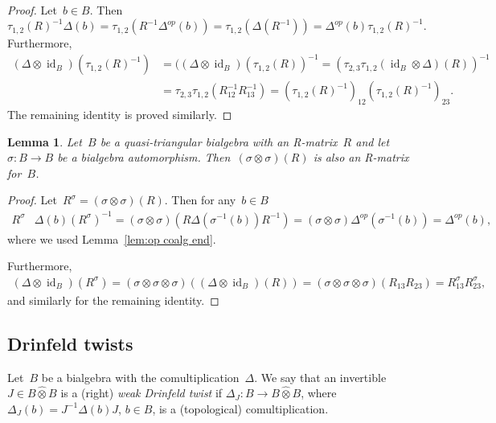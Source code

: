 \documentclass[12pt, reqno]{amsart}
\newcommand{\wh}[1]{\widehat{#1}}
\newtheorem{lemma}[theorem]{Lemma}
\theoremstyle{definition}
\numberwithin{equation}{section}
\newcommand{\tensor}{\otimes}
\DeclareMathOperator{\id}{id}
\begin{document}
\begin{proof}
Let~$b\in B$. Then 
$$
\tau_{1,2}(R)^{-1}\Delta(b)=\tau_{1,2}(R^{-1}\Delta^{op}(b))=\tau_{1,2}(\Delta(R^{-1}))=\Delta^{op}(b)
\tau_{1,2}(R)^{-1}.
$$
Furthermore, 
\begin{align*}
(\Delta\tensor\id_B)(\tau_{1,2}(R)^{-1})&=((\Delta\tensor\id_B)(\tau_{1,2}(R))^{-1}=(\tau_{2,3}\tau_{1,2}(\id_B\tensor \Delta)(R))^{-1}\\
&=\tau_{2,3}\tau_{1,2}(R_{12}^{-1}R_{13}^{-1})=(\tau_{1,2}(R)^{-1})_{12} (\tau_{1,2}(R)^{-1})_{23}.
\end{align*}
The remaining identity is proved similarly.
\end{proof}
\begin{lemma}
Let~$B$ be a quasi-triangular bialgebra with an R-matrix~$R$ and let $\sigma:B\to B$ be a bialgebra automorphism. Then~$(\sigma\tensor\sigma)(R)$
is also an R-matrix for~$B$.
\end{lemma}
\begin{proof}
Let~$R^\sigma=(\sigma\tensor\sigma)(R)$.
Then for any~$b\in B$
\begin{align*}
R^\sigma &\Delta(b)(R^{\sigma})^{-1}=
(\sigma\tensor\sigma)(R\Delta(\sigma^{-1}(b))R^{-1})
=(\sigma\tensor\sigma)\Delta^{op}(\sigma^{-1}(b))
=\Delta^{op}(b),
\end{align*}
where we used Lemma~\ref{lem:op coalg end}. 

Furthermore,
\begin{align*}
(\Delta\tensor\id_B)(R^\sigma)=(\sigma\tensor\sigma\tensor\sigma)((\Delta\tensor\id_B)(R))
=(\sigma\tensor\sigma\tensor\sigma)(R_{13}R_{23})=R_{13}^\sigma R_{23}^{\sigma},
\end{align*}
and similarly for the remaining identity.
\end{proof}


\subsection{Drinfeld twists}
Let~$B$ be a bialgebra with the comultiplication~$\Delta$. We say
that an invertible~$J\in B\wh \tensor B$ is a (right) {\em weak Drinfeld twist} if $\Delta_J:B\to B\wh\tensor B$, where  $\Delta_J(b)=J^{-1}\Delta(b) J$, $b\in B$,
is a (topological)
comultiplication.
\end{document}
